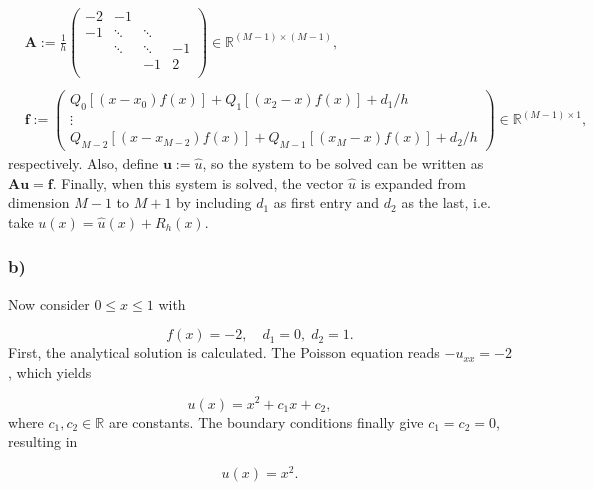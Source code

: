 \begin{equation}
\begin{split}
    &\mathbf{A} :=  \frac{1}{h}\begin{pmatrix}
        -2 & -1 &  &  \\
        -1 & \ddots & \ddots &  \\
         & \ddots & \ddots & -1  \\
         &  & -1 & 2  \\
    \end{pmatrix} \in \mathbb{R}^{(M-1) \times (M-1)}, \\  \\
     &\mathbf{f} := 
    \begin{pmatrix}
                Q_0[(x - x_0) f(x)] + Q_1[(x_2 - x) f(x)]  + d_1/h\\
                \vdots \\
                Q_{M-2}[(x - x_{M-2}) f(x)] + Q_{M-1}[(x_M - x) f(x)] + d_2/h 
    \end{pmatrix} \in \mathbb{R}^{(M-1) \times 1},
\end{split}
\label{5a.system}
\end{equation}
respectively. Also, define $\mathbf{u} := \hat{u}$, so the system to be solved can be written as $\mathbf{Au} = \mathbf{f}$. Finally, when this system is solved, the vector $\hat{u}$ is expanded from dimension $M-1$ to $M+1$ by including $d_1$ as first entry and $d_2$ as the last, i.e. take $u(x) = \hat{u}(x) + R_h(x)$. 


\subsubsection{b)}
Now consider $0 \le x \le 1$ with 

\begin{equation}
    f(x) = -2, \quad d_1 = 0, \; d_2 = 1.
\label{5b}
\end{equation}
First, the analytical solution is calculated. The Poisson equation reads $-u_{xx} = -2$, which yields

\begin{equation}
    u(x) = x^2 + c_1x + c_2,
\end{equation}
where $c_1,c_2 \in \mathbb{R}$ are constants. The boundary conditions finally give $c_1 = c_2 = 0$, resulting in

\begin{equation}
    u(x) = x^2.
\end{equation}

